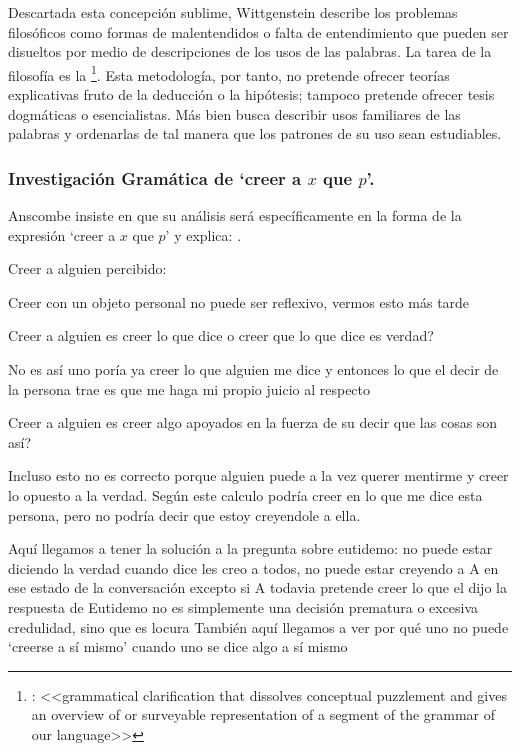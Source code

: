 Descartada esta concepción sublime, Wittgenstein describe los problemas
filosóficos como formas de malentendidos o falta de entendimiento que pueden ser
disueltos por medio de descripciones de los usos de las palabras. La tarea de la
filosofía es la \footnote{\cite[12]{bakerhacker2009understanding}: <<grammatical
  clarification that dissolves conceptual puzzlement and gives an overview of or
  surveyable representation of a segment of the grammar of our language>>}. Esta
metodología, por tanto, no pretende ofrecer teorías explicativas fruto de la
deducción o la hipótesis; tampoco pretende ofrecer tesis dogmáticas o
esencialistas. Más bien busca describir usos familiares de las palabras y
ordenarlas de tal manera que los patrones de su uso sean
estudiables\autocite[Cf.~][12]{bakerhacker2009understanding}.

\subsubsection{Investigación Gramática de `creer a $x$ que $p$'.}
Anscombe insiste en que su análisis será específicamente en la forma de la
expresión `creer a $x$ que $p$' y explica: .

Creer a alguien percibido:

Creer con un objeto personal no puede ser reflexivo, vermos esto más tarde

Creer a alguien es creer lo que dice o creer que lo que dice es verdad?

No es así
uno poría ya creer lo que alguien me dice y entonces lo que el decir de la
persona trae es que me haga mi propio juicio al respecto

Creer a alguien es creer algo apoyados en la fuerza de su decir que las cosas
son así?

Incluso esto no es correcto porque alguien puede a la vez querer mentirme y
creer lo opuesto a la verdad. Según este calculo podría creer en lo que me dice
esta persona, pero no podría decir que estoy creyendole a ella.


Aquí llegamos a tener la solución a la pregunta sobre eutidemo:
no puede estar diciendo la verdad cuando dice les creo a todos,
no puede estar creyendo a A en ese estado de la conversación excepto si A
todavia pretende creer lo que el dijo
la respuesta de Eutidemo no es simplemente una decisión prematura o excesiva
credulidad, sino que es locura
También aquí llegamos a ver por qué uno no puede `creerse a sí mismo' cuando uno
se dice algo a sí mismo

